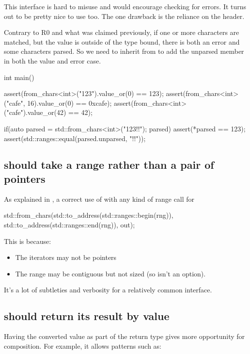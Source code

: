 \documentclass{wg21}
\begin{document}
This interface is hard to misuse and would encourage checking for errors.
It turns out to be pretty nice to use too.
The one drawback is the reliance on the  header.

Contrary to R0 and what was claimed previously, if one or more characters are matched, but the value is outside of the type
bound, there is both an error and some characters parsed.
So we need to inherit from  to add the unparsed member in both the value and error case.


\begin{colorblock}
    int main() {
        assert(from_chars<int>("123").value_or(0) == 123);
        assert(from_chars<int>("cafe", 16).value_or(0) == 0xcafe);
        assert(from_chars<int>("cafe").value_or(42) == 42);

        if(auto parsed = std::from_chars<int>("123!!"); parsed) {
            assert(*parsed == 123);
            assert(std::ranges::equal(parsed.unparsed, "!!"));
        }
    }
\end{colorblock}

\subsection{ should take a range rather than a pair of pointers}

As explained in , a correct use of  with any kind of range call for

\begin{colorblock}
std::from_chars(std::to_address(std::ranges::begin(rng)), std::to_address(std::ranges::end(rng)), out);
\end{colorblock}

This is because:
\begin{itemize}
\item The iterators may not be pointers
\item The range may be contiguous but not sized (so  isn't an option).
\end{itemize}

It's a lot of subtleties and verbosity for a relatively common interface.

\subsection{ should return its result by value}

Having the converted value as part of the return type gives more opportunity for composition.
For example, it allows patterns such as:
\end{document}
